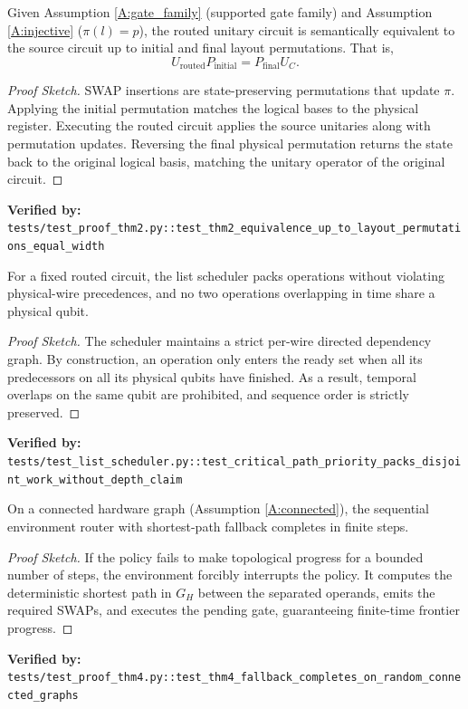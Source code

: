 \begin{theorem}
Given Assumption \ref{A:gate_family} (supported gate family) and Assumption \ref{A:injective} ($\pi(l) = p$), the routed unitary circuit is semantically equivalent to the source circuit up to initial and final layout permutations. That is,
\begin{equation}
 U_{\mathrm{routed}} P_{\mathrm{initial}} = P_{\mathrm{final}} U_C.
 \label{eq:equivalence_theory}
\end{equation}
\end{theorem}
\begin{proof}[Proof Sketch]
SWAP insertions are state-preserving permutations that update $\pi$. Applying the initial permutation matches the logical bases to the physical register. Executing the routed circuit applies the source unitaries along with permutation updates. Reversing the final physical permutation returns the state back to the original logical basis, matching the unitary operator of the original circuit.
\end{proof}
\noindent \textbf{Verified by:} \texttt{tests/test\_proof\_thm2.py::test\_thm2\_equivalence\_up\_to\_layout\_permutations\_equal\_width}

\begin{theorem}
For a fixed routed circuit, the list scheduler packs operations without violating physical-wire precedences, and no two operations overlapping in time share a physical qubit.
\end{theorem}
\begin{proof}[Proof Sketch]
The scheduler maintains a strict per-wire directed dependency graph. By construction, an operation only enters the ready set when all its predecessors on all its physical qubits have finished. As a result, temporal overlaps on the same qubit are prohibited, and sequence order is strictly preserved.
\end{proof}
\noindent \textbf{Verified by:} \texttt{tests/test\_list\_scheduler.py::test\_critical\_path\_priority\_packs\_disjoint\_work\_without\_depth\_claim}

\begin{theorem}
On a connected hardware graph (Assumption \ref{A:connected}), the sequential environment router with shortest-path fallback completes in finite steps.
\end{theorem}
\begin{proof}[Proof Sketch]
If the policy fails to make topological progress for a bounded number of steps, the environment forcibly interrupts the policy. It computes the deterministic shortest path in $G_H$ between the separated operands, emits the required SWAPs, and executes the pending gate, guaranteeing finite-time frontier progress.
\end{proof}
\noindent \textbf{Verified by:} \texttt{tests/test\_proof\_thm4.py::test\_thm4\_fallback\_completes\_on\_random\_connected\_graphs}

